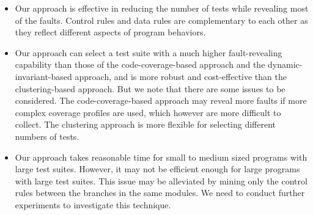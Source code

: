 \documentclass{sig-alternate}
\begin{document}
\begin{itemize}
\item \vspace{-0.1in}
Our approach is effective in reducing the number of tests while
revealing most of the faults. Control rules and data rules are
complementary to each other as they reflect different aspects of
program behaviors.


\item \vspace{-0.1in}
Our approach can select a test suite with a much higher
fault-revealing capability than those of the code-coverage-based
approach and the dynamic-invariant-based approach, and is more
robust and cost-effective than the clustering-based approach.
But we note that there are some issues to be considered. The
code-coverage-based approach may reveal more faults if more complex
coverage profiles are used, which however are more difficult to
collect. The clustering approach is more flexible for selecting
different numbers of tests.
\item \vspace{-0.1in}
Our approach takes reasonable time for small to medium sized
programs with large test suites. However, it may not be efficient
enough for large programs with large test suites. This issue may be
alleviated by mining only the control rules between the branches in
the same modules. We need to conduct further experiments to
investigate this technique.
\end{itemize}
\end{document}
